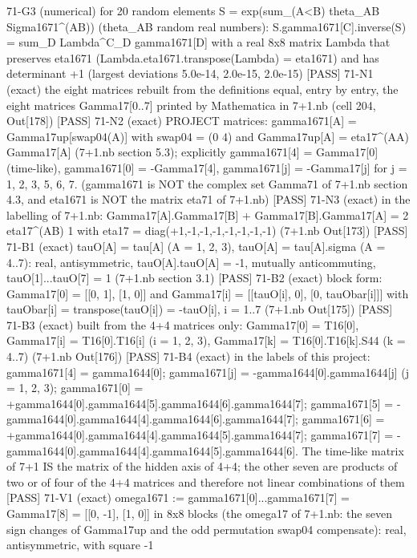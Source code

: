 \documentclass[
  10pt,
]{article}
\newenvironment{Shaded}{}{}
\newcommand{\NormalTok}[1]{#1}
\begin{document}
\begin{Shaded}
\begin{Highlighting}[]
\NormalTok{[PASS] 71{-}G3  (numerical) for 20 random elements S = exp(sum\_(A\textless{}B) theta\_AB Sigma1671\^{}(AB)) (theta\_AB random real numbers):  S.gamma1671[C].inverse(S) = sum\_D Lambda\^{}C\_D gamma1671[D] with a real 8x8 matrix Lambda that preserves eta1671 (Lambda.eta1671.transpose(Lambda) = eta1671) and has determinant +1 (largest deviations 5.0e{-}14, 2.0e{-}15, 2.0e{-}15)}
\NormalTok{[PASS] 71{-}N1  (exact) the eight matrices rebuilt from the definitions equal, entry by entry, the eight matrices Gamma17[0..7] printed by Mathematica in 7+1.nb (cell 204, Out[178])}
\NormalTok{[PASS] 71{-}N2  (exact) PROJECT matrices: gamma1671[A] = Gamma17up[swap04(A)] with swap04 = (0 4) and Gamma17up[A] = eta17\^{}(AA) Gamma17[A] (7+1.nb section 5.3); explicitly gamma1671[4] = Gamma17[0] (time{-}like), gamma1671[0] = {-}Gamma17[4], gamma1671[j] = {-}Gamma17[j] for j = 1, 2, 3, 5, 6, 7.  (gamma1671 is NOT the complex set Gamma71 of 7+1.nb section 4.3, and eta1671 is NOT the matrix eta71 of 7+1.nb)}
\NormalTok{[PASS] 71{-}N3  (exact) in the labelling of 7+1.nb: Gamma17[A].Gamma17[B] + Gamma17[B].Gamma17[A] = 2 eta17\^{}(AB) 1 with eta17 = diag(+1,{-}1,{-}1,{-}1,{-}1,{-}1,{-}1,{-}1) (7+1.nb Out[173])}
\NormalTok{[PASS] 71{-}B1  (exact) tauO[A] = tau[A] (A = 1, 2, 3), tauO[A] = tau[A].sigma (A = 4..7): real, antisymmetric, tauO[A].tauO[A] = {-}1, mutually anticommuting, tauO[1]...tauO[7] = 1 (7+1.nb section 3.1)}
\NormalTok{[PASS] 71{-}B2  (exact) block form: Gamma17[0] = [[0, 1], [1, 0]] and Gamma17[i] = [[tauO[i], 0], [0, tauObar[i]]] with tauObar[i] = transpose(tauO[i]) = {-}tauO[i], i = 1..7 (7+1.nb Out[175])}
\NormalTok{[PASS] 71{-}B3  (exact) built from the 4+4 matrices only: Gamma17[0] = T16[0], Gamma17[i] = T16[0].T16[i] (i = 1, 2, 3), Gamma17[k] = T16[0].T16[k].S44 (k = 4..7) (7+1.nb Out[176])}
\NormalTok{[PASS] 71{-}B4  (exact) in the labels of this project: gamma1671[4] = gamma1644[0]; gamma1671[j] = {-}gamma1644[0].gamma1644[j] (j = 1, 2, 3); gamma1671[0] = +gamma1644[0].gamma1644[5].gamma1644[6].gamma1644[7]; gamma1671[5] = {-}gamma1644[0].gamma1644[4].gamma1644[6].gamma1644[7]; gamma1671[6] = +gamma1644[0].gamma1644[4].gamma1644[5].gamma1644[7]; gamma1671[7] = {-}gamma1644[0].gamma1644[4].gamma1644[5].gamma1644[6].  The time{-}like matrix of 7+1 IS the matrix of the hidden axis of 4+4; the other seven are products of two or of four of the 4+4 matrices and therefore not linear combinations of them}
\NormalTok{[PASS] 71{-}V1  (exact) omega1671 := gamma1671[0]...gamma1671[7] = Gamma17[8] = [[0, {-}1], [1, 0]] in 8x8 blocks (the omega17 of 7+1.nb: the seven sign changes of Gamma17up and the odd permutation swap04 compensate): real, antisymmetric, with square {-}1}

\end{Highlighting}
\end{Shaded}
\end{document}
